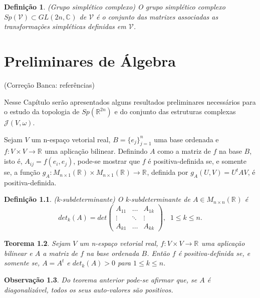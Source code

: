 \documentclass[12pt]{book}
\newtheorem{teorema}{Teorema}[section]
\newtheorem{definicao}[teorema]{Definição}
\newtheorem{observacao}[teorema]{Observação}
\newcommand{\complexificado}[1]{\mathcal{#1}}
\newcommand{\complexo}[1]{\mathbb{C}^{#1}}
\newcommand{\estruturascomplexas}[2]{\mathcal{J}(#1, #2)}
\newcommand{\generalgroup}[2]{GL(#1, #2)}
\newcommand{\generalgroupcomplexo}[1]{\generalgroup{#1}{\complexo{}}}
\newcommand{\gruposimpletico}[1]{Sp(#1)}
\newcommand{\matrizquadreal}[1]{M_{#1 \times #1}(\real{})}
\newcommand{\real}[1]{\mathbb{R}^{#1}}
\newcommand{\reta}{\real{}}
\newcommand{\alerta}[1]{{\color{red}#1}}
\newcommand{\correcaobanca}[1]{\alerta{(Correção Banca: #1)}}
\begin{document}
	\begin{definicao}
		(Grupo simplético complexo) O grupo simplético complexo $\gruposimpletico{\complexificado{V}} \subset \generalgroupcomplexo{2n}$ de $\complexificado{V}$ é o conjunto das matrizes associadas as transformações simpléticas definidas em $\complexificado{V}$.
	\end{definicao}
	
	\chapter{Preliminares de Álgebra}
	
	\correcaobanca{referências}
	
	Nesse Capítulo serão apresentados alguns resultados preliminares necessários para o estudo da topologia de $\gruposimpletico{\real{2n}}$ e do conjunto das estruturas complexas $\estruturascomplexas{V}{\omega}$.
	
	
	Sejam $V$ um n-espaço vetorial real, $B= \{e_{j}\}_{j=1}^{n}$ uma base ordenada e $f:V\times V\to \reta$ uma aplicação bilinear. Definindo $A$ como a matriz de $f$ na base $B$, isto é, $A_{ij} = f(e_{i}, e_{j})$, pode-se mostrar que $f$ é positiva-definida se, e somente se, a função $g_{A}: M_{n\times 1}(\reta)\times M_{n\times 1}(\reta) \to \reta$, definida por $
	g_{A}(U,V) = U^{t}AV$, é positiva-definida.
	
	\begin{definicao}
		(k-subdeterminante) O k-subdeterminante de $A \in \matrizquadreal{n}$ é 
		$$
		det_{k}(A) =
		det \left(
		\begin{array}{ccc}
		A_{11} & \dots & A_{1k}
		\\
		\vdots & \ddots & \vdots
		\\
		A_{k1} & \dots & A_{kk}
		\end{array}
		\right),\;\; 1\leq k \leq n.
		$$
	\end{definicao}
	
	\begin{teorema}\label{teorema_matriz_positiva_definida}
		Sejam $V$ um n-espaço vetorial real, $f: V\times V\to \reta$ uma aplicação bilinear e $A$ a matriz de $f$ na base ordenada $B$. Então $f$ é positiva-definida se, e somente se, $A=A^{t}$ e $det_{k}(A)>0$ para $1\leq k\leq n$.
	\end{teorema}
	
	\begin{observacao}\label{observacao_matriz_positiva_definida}
		Do teorema anterior pode-se afirmar que, se $A$ é diagonalizável, todos os seus auto-valores são positivos.
	\end{observacao}
	
\end{document}
